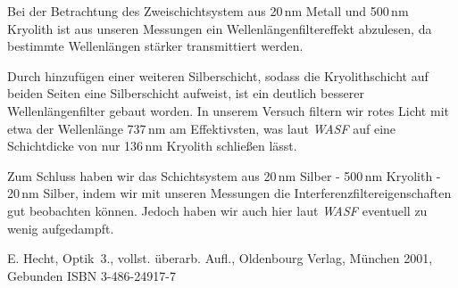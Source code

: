 \documentclass[10pt,twoside]{article}
\renewcommand{\1}{^{-1}}
\renewcommand{\2}{^{-2}}
\newcommand{\3}{^{-3}}
\newcommand{\4}{^{-4}}
\newcommand{\5}{^{-5}}
\newcommand{\6}{^{-6}}
\newcommand{\7}{^{-7}}
\newcommand{\8}{^{-8}}
\newcommand{\9}{^{-9}}
\begin{document}
Bei der Betrachtung des Zweischichtsystem aus 20\,nm Metall und 500\,nm Kryolith ist aus unseren Messungen ein Wellenlängenfiltereffekt abzulesen, da bestimmte Wellenlängen stärker transmittiert werden.

Durch hinzufügen einer weiteren Silberschicht, sodass die Kryolithschicht auf beiden Seiten eine Silberschicht aufweist, ist ein deutlich besserer Wellenlängenfilter gebaut worden. In unserem Versuch filtern wir rotes Licht mit etwa der Wellenlänge 737\,nm am Effektivsten, was laut \textit{WASF} auf eine Schichtdicke von nur 136\,nm Kryolith schließen lässt. 

Zum Schluss haben wir das Schichtsystem aus 20\,nm Silber - 500\,nm Kryolith - 20\,nm Silber, indem wir mit unseren Messungen die Interferenzfiltereigenschaften gut beobachten können. Jedoch haben wir auch hier laut \textit{WASF} eventuell zu wenig aufgedampft. 

\renewcommand{\refname}{\textbf{Literaturverzeichnis}}
\begin{thebibliography}{xxxxxxxxxxxxxxx}

 		  		\glqq E. Hecht, Optik\grqq~3., vollst. überarb. Aufl., Oldenbourg Verlag, München 2001, Gebunden 
ISBN 3-486-24917-7
		 
\end{thebibliography}
\end{document}
